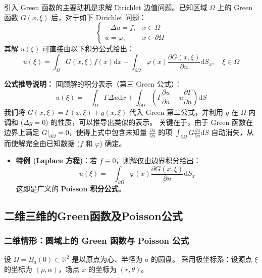 \documentclass[12pt,a4paper]{ctexart}
\begin{document}
	引入 Green 函数的主要动机是求解 Dirichlet 边值问题。已知区域 $\Omega$ 上的 Green 函数 $G(x, \xi)$ 后，对于如下 Dirichlet 问题：
	\begin{equation}
		\begin{cases}
			-\Delta u = f, & x \in \Omega \\
			u = \varphi, & x \in \partial \Omega
		\end{cases}
	\end{equation}
	其解 $u(\xi)$ 可直接由以下积分公式给出：
	\begin{equation}
		u(\xi) = \int_{\Omega} G(x, \xi) f(x) \mathrm{d}x - \int_{\partial \Omega} \varphi(x) \frac{\partial G(x, \xi)}{\partial n} \mathrm{d}S_x, \quad \xi \in \Omega
	\end{equation}
	
	\textbf{公式推导说明：}
	回顾解的积分表示（第三 Green 公式）：
	\[
	u(\xi) = - \int_{\Omega} \Gamma \Delta u \mathrm{d}x + \int_{\partial \Omega} \left( \Gamma \frac{\partial u}{\partial n} - u \frac{\partial \Gamma}{\partial n} \right) \mathrm{d}S
	\]
	我们将 $G(x, \xi) = \Gamma(x, \xi) + g(x, \xi)$ 代入 Green 第二公式，并利用 $g$ 在 $\Omega$ 内调和 ($\Delta g = 0$) 的性质，可以推导出类似的表示。
	关键在于，由于 Green 函数在边界上满足 $G|_{\partial \Omega} = 0$，使得上式中包含未知量 $\frac{\partial u}{\partial n}$ 的项 $\int_{\partial \Omega} G \frac{\partial u}{\partial n} \mathrm{d}S$ 自动消失，从而使解完全由已知数据 ($f$ 和 $\varphi$) 确定。
	
	\begin{itemize}
		\item \textbf{特例 (Laplace 方程)}：若 $f \equiv 0$，则解仅由边界积分给出：
		\begin{equation}
			u(\xi) = - \int_{\partial \Omega} \varphi(x) \frac{\partial G(x, \xi)}{\partial n} \mathrm{d}S_x
		\end{equation}
		这即是广义的 \textbf{Poisson 积分公式}。
	\end{itemize}


	\subsection{二维三维的Green函数及Poisson公式}
	
	\subsubsection{二维情形：圆域上的 Green 函数与 Poisson 公式}
	
	设 $\Omega = B_a(0) \subset \mathbb{R}^2$ 是以原点为心、半径为 $a$ 的圆盘。
	采用极坐标系：设源点 $\xi$ 的坐标为 $(\rho, \alpha)$，场点 $x$ 的坐标为 $(r, \theta)$。
	
\end{document}
